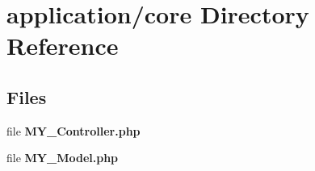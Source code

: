 \section{application/core Directory Reference}
\label{dir_dd7203712b918cee33f6bc4a130d95f5}
\subsection*{Files}
\begin{DoxyCompactItemize}
\item 
file {\bf M\-Y\-\_\-\-Controller.\-php}
\item 
file {\bf M\-Y\-\_\-\-Model.\-php}
\end{DoxyCompactItemize}
